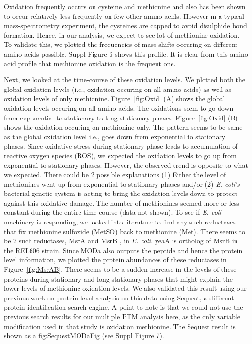 \documentclass[12pt]{article}
\begin{document}
Oxidation frequently occurs on cysteine and methionine and also has been shown to occur relatively less frequently on few other amino acids. However in a typical mass-spectrometry experiment, the cysteines are capped to avoid disulphide bond formation. Hence, in our analysis, we expect to see lot of methionine oxidation. To validate this, we plotted the frequencies of mass-shifts occuring on different amino acids possible. Suppl Figure 6 shows this profile. It is clear from this amino acid profile that methionine oxidation is the frequent one.

Next, we looked at the time-course of these oxidation levels. We plotted both the global oxidation levels (i.e., oxidation occuring on all amino acids) as well as oxidation levels of only methionine. Figure~\ref{fig:Oxid} (A) shows the global oxidation levels occuring on all amino acids. The oxidations seem to go down from exponential to stationary to long stationary phases. Figure~\ref{fig:Oxid} (B) shows the oxidation occuring on methionine only. The pattern seems to be same as the global oxidation level i.e., goes down from exponential to stationary phases. Since oxidative stress during stationary phase leads to accumulation of reactive oxygen species (ROS), we expected the oxidation levels to go up from exponential to stationary phases. However, the observed trend is opposite to what we expected. There could be 2 possible explanations (1) Either the level of methionines went up from exponential to stationary phases and/or (2) \emph{E. coli's} bacterial genetic system is acting to bring the oxidation levels down to protect against this oxidative damage. The number of methionines seemed more or less constant during the entire time course (data not shown). To see if \emph{E. coli} machinery is responding, we looked into literature to find any such reductases that fix methionine sulfoxide (MetSO) back to methionine (Met).  There seems to be 2 such reductases, MsrA \cite{Abramsetal1981} and MsrB \cite{Grimaudetal2001}, in \emph{E. coli}. yeaA is ortholog of MsrB in the REL606 strain. Since MODa also outputs the peptide and hence the protein level information, we plotted the protein abundances of these reductases in Figure~\ref{fig:MsrAB}. There seems to be a sudden increase in the levels of these proteins during stationary and long-stationary phases that might explain the lower levels of methionine oxidation levels. We also validated this result using our previous work \cite{Houseretal2015} on protein level analysis on this data using Sequest, a different protein identification search engine. A point to note is that we could not use the previous search results for our multiple PTM analysis here, as the only variable modification used in that study is oxidation methionine. The Sequest result is shown as a fig:SequestMODaFig (see Suppl Figure 7).
\end{document}
